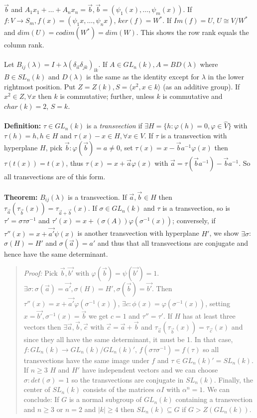 ${\vec b}$  and $A_1 x_1 + \ldots + A_n x_n= {\vec b}, 
{\vec b}= (\psi_1(x), \ldots, \psi_m (x))$.
If $f: V \rightarrow S_m, f(x)= (\psi_1x , \ldots , \psi_n x)$, 
$ker(f) = W^*$. If $Im(f)=U$, $U \cong V/W^*$ and $dim(U)=codim(W^*)=dim(W)$.
This shows
the row rank equals the column rank.
\\
\\
Let $B_{ij}(\lambda) = I + \lambda (\delta_{il} \delta_{jk})_{lk}$.  If
$A \in GL_n(k), A=BD(\lambda)$ where $B \in SL_n(k)$ and $D(\lambda)$ is the same as
the identity except for $\lambda$ in the lower rightmost position.
Put $Z=Z(k), S= \langle x^2, x \in k \rangle$ (as an additive group).  
If $x^2 \in Z, \forall x$  then
$k$ is commutative; further, unless $k$ is commutative and $char(k)=2$, $S=k$.
\\
\\
{\bf Definition:} $\tau \in GL_n(k)$ is a \emph{transvection} if 
$\exists H= \{h: \varphi(h) =0, \varphi \in {\hat V} \}$ with $\tau(h) =h, h \in H$ and
$\tau(x)-x \in H, \forall x \in V$.
If $\tau$ is a transvection with hyperplane
$H$, pick ${\vec b}: \varphi({\vec b})= a \ne 0$, set $\tau(x) = x-{\vec b} a^{-1} \varphi(x)$
then $\tau (t(x))=t(x)$, thus 
$\tau(x)= x+ {\vec a} \varphi(x)$ with ${\vec a}= \tau({\vec b} a^{-1})-{\vec b} a^{-1}$.
So all transvections are of this form.
\\
\\
{\bf Theorem:}
$B_{ij}(\lambda)$ is a transvection.
If $ {\vec a}, {\vec b} \in H$ then
$\tau_{\vec a} (\tau_{\vec b}(x))= \tau_{{\vec a}+{\vec b}} (x)$.  
If $\sigma \in GL_n(k)$ and $\tau$ is a transvection, so is $\tau' = \sigma \tau \sigma^{-1}$
and $\tau'(x)= x+ (\sigma(A)) \varphi(\sigma^{-1}(x))$; conversely, if
$\tau''(x)=x+{\vec {a'}} \psi(x)$ is another transvection with hyperplane $H'$,
we show $\exists \sigma$: $\sigma(H)= H'$ and $\sigma({\vec a}) = a'$ and thus that
all transvections are conjugate and hence have the same determinant.
\begin{quote}
\emph{Proof:} Pick ${\vec b}, {\vec {b'}}$ with $\varphi({\vec b})=\psi({\vec {b'}})=1$.
$\exists \sigma: \sigma({\vec a})= {\vec {a'}}, \sigma(H)= H', \sigma({\vec b})= {\vec {b'}}$.
Then $\tau''(x)=x + {\vec {a'}} \varphi(\sigma^{-1}(x))$, 
$\exists c: \phi(x)=\varphi(\sigma^{-1}(x))$, setting $x= {\vec {b'}}, \sigma^{-1}(x)={\vec b}$
we get $c=1$ and $\tau''= \tau'$. If $H$ has at least three vectors then 
$\exists {\vec a}, {\vec b}, {\vec c}$ with
${\vec c}= {\vec a} + {\vec b}$ and
$\tau_{\vec a} (\tau_{\vec b}(x))= \tau_{\vec c} (x)$ and since they 
all have the same determinant, it must be 1.
In that case, $f:GL_n(k) \rightarrow GL_n(k)/GL_n(k)'$, $f(\sigma \tau \sigma^{-1})= f(\tau)$
so all transvections have the same image under $f$ and $\tau \in GL_n(k)'=SL_n(k)$.
If $n \ge 3$ $H$ and $H'$ have independent vectors and we can choose $\sigma: det(\sigma)=1$
so the transvections are conjugate in $SL_n(k)$.  Finally, the center of $SL_n(k)$
consists of the matrices $\alpha I$ with $\alpha^n=1$.  We can conclude:
If $G$ is a normal subgroup of $GL_n(k)$ containing a transvection and
$n \ge 3$ or $n=2$ and $|k| \ge 4$ then $SL_n(k) \subseteq G$ if $G>Z(GL_n(k))$.
\end{quote}
